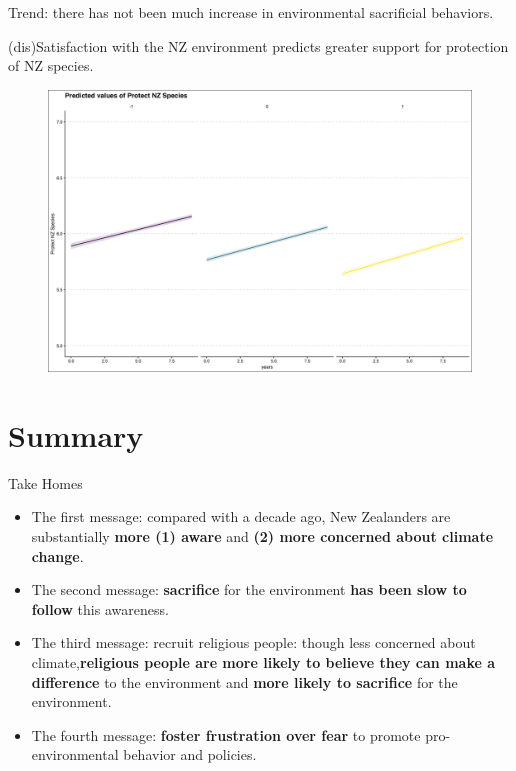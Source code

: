 \documentclass{beamer}
\begin{document}
\begin{frame}{Trend: there has not been much increase in environmental sacrificial behaviors.}
\begin{frame}{(dis)Satisfaction with the NZ environment predicts greater support for protection of NZ species.}
\begin{figure}
\includegraphics[width=.8\textwidth,height=\textheight,keepaspectratio]{Figures/XY_PLOT_Env.NATIVE.SPECIES.SATENVIRON.png}
\end{figure}
\end{frame}


\section{Summary}

\begin{frame}{Take Homes}

  \begin{itemize}
  \item
         The \alert{first message}: compared with a decade ago, New Zealanders are substantially {\bf more (1) aware} and {\bf (2) more concerned about climate change}.
        \pause
  \item
    The  \alert{second message}: {\bf sacrifice} for the environment {\bf has been slow to follow} this awareness.
    \pause
    
     \item
    The  \alert{third message}: recruit religious people: though less concerned about climate,{\bf religious people are more likely to believe they can make a difference} to the environment and {\bf more likely to sacrifice} for the environment.
     \pause
     
    \item
    The  \alert{fourth message}: {\bf foster frustration over fear} to promote pro-environmental behavior and policies.
    

\end{itemize}
\end{frame}
\end{frame}
\end{document}
